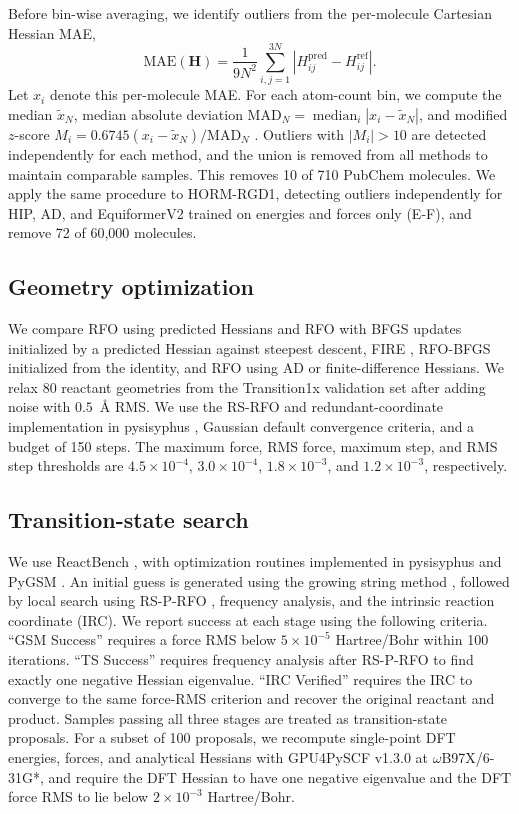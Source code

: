 \documentclass[pdflatex,sn-mathphys-num]{sn-jnl}%
\begin{document}
Before bin-wise averaging, we identify outliers from the per-molecule Cartesian Hessian MAE,
\[
\mathrm{MAE}(\mathbf{H})=\frac{1}{9N^2}\sum_{i,j=1}^{3N}\left|H^{\mathrm{pred}}_{ij}-H^{\mathrm{ref}}_{ij}\right|.
\]
Let \(x_i\) denote this per-molecule MAE. For each atom-count bin, we compute the median \(\tilde{x}_N\), median absolute deviation \(\mathrm{MAD}_N=\operatorname{median}_i|x_i-\tilde{x}_N|\), and modified \(z\)-score \(M_i=0.6745(x_i-\tilde{x}_N)/\mathrm{MAD}_N\) \citep{iglewicz1993outliers}. Outliers with \(|M_i|>10\) are detected independently for each method, and the union is removed from all methods to maintain comparable samples. This removes 10 of 710 PubChem molecules. We apply the same procedure to HORM-RGD1, detecting outliers independently for HIP, AD, and EquiformerV2 trained on energies and forces only (E-F), and remove 72 of 60,000 molecules.

\subsection{Geometry optimization}
We compare RFO using predicted Hessians and RFO with BFGS updates initialized by a predicted Hessian against steepest descent, FIRE \citep{bitzek2006}, RFO-BFGS initialized from the identity, and RFO using AD or finite-difference Hessians. We relax 80 reactant geometries from the Transition1x validation set after adding noise with \(0.5\)~\AA{} RMS. We use the RS-RFO and redundant-coordinate implementation in pysisyphus \citep{steinmetzer2021,herbolComputationalImplementationNudged2017}, Gaussian default convergence criteria, and a budget of 150 steps. The maximum force, RMS force, maximum step, and RMS step thresholds are \(4.5\times10^{-4}\), \(3.0\times10^{-4}\), \(1.8\times10^{-3}\), and \(1.2\times10^{-3}\), respectively.

\subsection{Transition-state search}
We use ReactBench \citep{zhao2025}, with optimization routines implemented in pysisyphus \citep{steinmetzer2021} and PyGSM \citep{aldazZimmermanGroupPyGSM2025}. An initial guess is generated using the growing string method \citep{zimmerman2015}, followed by local search using RS-P-RFO \citep{RSRFO1998a}, frequency analysis, and the intrinsic reaction coordinate (IRC). We report success at each stage using the following criteria. ``GSM Success'' requires a force RMS below \(5\times10^{-5}\) Hartree/Bohr within 100 iterations. ``TS Success'' requires frequency analysis after RS-P-RFO to find exactly one negative Hessian eigenvalue. ``IRC Verified'' requires the IRC to converge to the same force-RMS criterion and recover the original reactant and product. Samples passing all three stages are treated as transition-state proposals. For a subset of 100 proposals, we recompute single-point DFT energies, forces, and analytical Hessians with GPU4PySCF v1.3.0 \citep{wu2025gpu4pyscf} at $\omega$B97X/6-31G*, and require the DFT Hessian to have one negative eigenvalue and the DFT force RMS to lie below \(2\times10^{-3}\) Hartree/Bohr.
\end{document}
